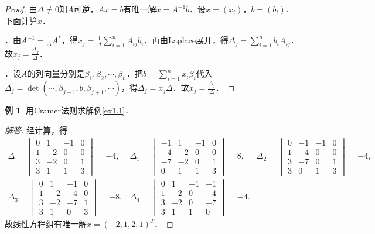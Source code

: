 \documentclass[a4paper,fontset=windows]{ctexbook}
\theoremstyle{definition}
\newtheorem{example}{例}[chapter]
\begin{document}
\begin{proof}
由$\Delta\ne 0$知$A$可逆，$Ax=b$有唯一解$x=A^{-1}b$．设$x=(x_i)$，$b=(b_i)$．下面计算$x$．

．由$A^{-1}=\frac{1}{\Delta}A^*$，得$x_j=\frac{1}{\Delta}\sum\limits_{i=1}^nA_{ij}b_i$．再由Laplace展开，得$\Delta_j=\sum\limits_{i=1}^nb_iA_{ij}$．故$x_j=\frac{\Delta_j}{\Delta}$．

．设$A$的列向量分别是$\beta_1,\beta_2,\cdots,\beta_n$．把$b=\sum\limits_{i=1}^nx_i\beta_i$代入$\Delta_j=\det(\cdots,\beta_{j-1},b,\beta_{j+1},\cdots)$，得$\Delta_j=x_j\Delta$．故$x_j=\frac{\Delta_j}{\Delta}$．
\end{proof}

\begin{example}
用Cramer法则求解例\ref{ex1.1}．
\end{example}

\begin{proof}[解答]
经计算，得
$$\begin{array}{lll}
\Delta=\begin{vmatrix}0&1&-1&0 \\ 1&-2&0&0 \\ 3&-2&0&1 \\ 3&1&1&3\end{vmatrix}=-4, &\Delta_1=\begin{vmatrix}-1&1&-1&0 \\ -4&-2&0&0 \\ -7&-2&0&1 \\ 0&1&1&3\end{vmatrix}=8, &\Delta_2=\begin{vmatrix}0&-1&-1&0 \\ 1&-4&0&0 \\ 3&-7&0&1 \\ 3&0&1&3\end{vmatrix}=-4, \\
\Delta_3=\begin{vmatrix}0&1&-1&0 \\ 1&-2&-4&0 \\ 3&-2&-7&1 \\ 3&1&0&3\end{vmatrix}=-8, &\Delta_4=\begin{vmatrix}0&1&-1&-1 \\ 1&-2&0&-4 \\ 3&-2&0&-7 \\ 3&1&1&0\end{vmatrix}=-4.
\end{array}$$
故线性方程组有唯一解$x=(-2,1,2,1)^T$．
\end{proof}
\end{document}
